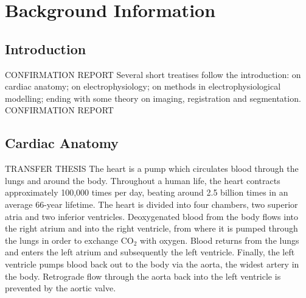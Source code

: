 \chapter{Background Information}
\dblspace
\begin{quote}{\em }\end{quote}

\section{Introduction}
\label{sec:review:introduction}
CONFIRMATION REPORT
Several short treatises follow the introduction: on cardiac anatomy; on electrophysiology; on methods in electrophysiological modelling; ending with some theory on imaging, registration and segmentation.
CONFIRMATION REPORT

\section{Cardiac Anatomy}
TRANSFER THESIS
  The heart is a pump which circulates blood through the lungs and around the body. Throughout a human life, the heart contracts approximately 100,000 times per day, beating around 2.5 billion times in an average 66-year lifetime. The heart is divided into four chambers, two superior atria and two inferior ventricles. Deoxygenated blood from the body flows into the right atrium and into the right ventricle, from where it is pumped through the lungs in order to exchange CO$_2$ with oxygen. Blood returns from the lungs and enters the left atrium and subsequently the left ventricle. Finally, the left ventricle pumps blood back out to the body via the aorta, the widest artery in the body. Retrograde flow through the aorta back into the left ventricle is prevented by the aortic valve.
  
